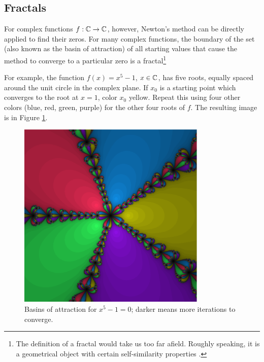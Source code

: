 \subsection{Fractals}


For complex functions $f:\mathbb{C}\to\mathbb{C}$, however, Newton's method can be directly applied 
to find their zeros. For many complex functions, the boundary of the 
set (also known as the basin of attraction) of all starting values
that cause the method to converge to a particular zero is a 
fractal\footnote{The definition of a fractal would take us too far afield.
Roughly speaking, it is a geometrical object with
certain self-similarity properties \cite{F}.}

For example, the function $f(x)=x^5-1$, $x\in \mathbb{C}$, has five roots,
equally spaced around the unit circle in the complex plane.
If $x_0$ is a starting point which converges to the root at $x=1$, color $x_0$ yellow.
Repeat this using four other colors (blue, red, green, purple)
for the other four roots of $f$. 
The resulting image is in Figure \ref{fig:newtons-fractal}.

\begin{figure}[h!]
\begin{minipage}{\textwidth}
\begin{center}
\includegraphics[height=9cm,width=9cm]{newtons-fractal.eps}
\end{center}
\end{minipage}
\caption{Basins of attraction for $x^5 - 1 = 0$; darker means more iterations to converge.}
\label{fig:newtons-fractal}
\end{figure}

